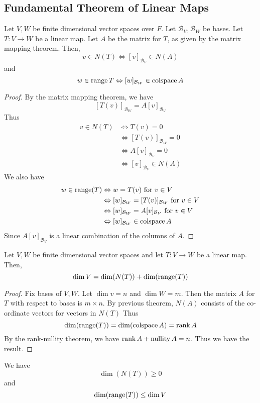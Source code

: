 \documentclass{article}
\DeclareMathOperator{\nullity}{nullity}
\DeclareMathOperator{\colspace}{colspace}
\begin{document}
\subsection{Fundamental Theorem of Linear Maps}
\begin{theorem}
  Let $V, W$ be finite dimensional vector spaces over $F$. Let $\mathcal{B}_V, \mathcal{B}_W$ be bases. Let $T: V \to W$ be a linear map. Let $A$ be the matrix for $T$, as given by the matrix mapping theorem. Then,
  \[
    v \in N(T) \iff [v]_{\mathcal{B}_V} \in N(A)
  \] and \[
    w \in \range T \iff [w]_{\mathcal{B}_W} \in \colspace A
  \]
\end{theorem}
\begin{proof}
  By the matrix mapping theorem, we have \[
    [T(v)]_{\mathcal{B}_W} = A[v]_{\mathcal{B}_V}
  \]
  Thus
  \begin{align*}
    v \in N(T) & \iff T(v) = 0                     \\
               & \iff [T(v)]_{\mathcal{B}_W} = 0   \\
               & \iff A[v]_{\mathcal{B}_V} = 0     \\
               & \iff [v]_{\mathcal{B}_V} \in N(A)
  \end{align*}
  We also have
  \begin{align*}
    w \in \range(T) & \iff w = T(v) \text{ for } v \in V                                     \\
                    & \iff [w]_{\mathcal{B}_W} = [T(v)]_{\mathcal{B}_W} \text{ for } v \in V \\
                    & \iff [w]_{\mathcal{B}_W} = A[v]_{\mathcal{B}_V} \text{ for } v \in V   \\
                    & \iff [w]_{\mathcal{B}_W} \in \colspace A                               \\
  \end{align*}
  Since $A[v]_{\mathcal{B}_V}$ is a linear combination of the columns of $A$.
\end{proof}
\begin{cthm}
  Let $V, W$ be finite dimensional vector spaces and let $T: V \to W$ be a linear map. Then, \[
    \dim V = \dim(N(T)) + \dim(\operatorname{\text{range}}(T))
  \]
\end{cthm}
\begin{proof}
  Fix bases of $V, W$. Let $\dim v = n$ and $\dim W = m$. Then the matrix $A$ for $T$ with respect to bases is $m \times n$. By previous theorem, $N(A)$ consists of the co-ordinate vectors for vectors in $N(T)$ Thus \[
    \dim(\range(T)) = \dim(\colspace A) = \rank A
  \]
  By the rank-nullity theorem, we have $\rank A + \nullity A = n$. Thus we have the result.
\end{proof}
\begin{corollary}
  We have \[
    \dim(N(T)) \geq 0
  \] and \[
    \dim(\operatorname{\text{range}}(T)) \leq \dim V
  \]
\end{corollary}
\end{document}
